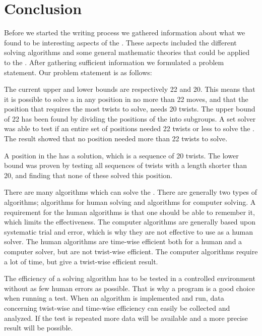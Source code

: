 \chapter{Conclusion}

Before we started the writing process we gathered information about what we found to be interesting aspects of the \rubik{}. 
These aspects included the different solving algorithms and some general mathematic theories that could be applied to the \rubik{}.
After gathering sufficient information we formulated a problem statement. Our problem statement is as follows:


\linebreak

The current upper and lower bounds are respectively 22 and 20. 
This means that it is possible to solve a \rubik{} in any position in no more than 22 moves, and that the \rubik{} position that requires the most twists to solve, needs 20 twists.
The upper bound of 22 has been found by dividing the positions of the \rubik{} into subgroups. A set solver was able to test if an entire set of positions needed 22 twists or less to solve the \rubik{}. The result showed that no \rubik{} position needed more than 22 twists to solve.

A position in the \rubik{} has a solution, which is a sequence of 20 twists. The lower bound was proven by testing all sequences of twists with a length shorter than 20, and finding that none of these solved this position.

There are many algorithms which can solve the \rubik{}. 
There are generally two types of algorithms; algorithms for human solving and algorithms for computer solving. 
A requirement for the human algorithms is that one should be able to remember it, which limits the effectiveness. 
The computer algorithms are generally based upon systematic trial and error, which is why they are not effective to use as a human solver.
The human algorithms are time-wise efficient both for a human and a computer solver, but are not twist-wise efficient.
The computer algorithms require a lot of time, but give a twist-wise efficient result.

The efficiency of a solving algorithm has to be tested in a controlled environment without as few human errors as possible. 
That is why a program is a good choice when running a test.
When an algorithm is implemented and run, data concerning twist-wise and time-wise efficiency can easily be collected and analyzed. 
If the test is repeated more data will be available and a more precise result will be possible.



